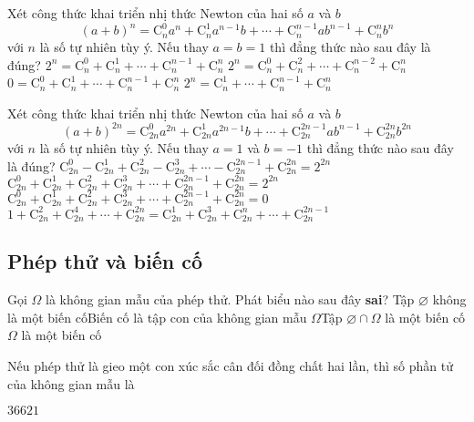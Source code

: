 \begin{ex}%
	Xét công thức khai triển nhị thức Newton của hai số $a$ và $b$
	$$\left(a+b\right)^n=\mathrm{C}^0_na^n+\mathrm{C}^1_na^{n-1}b+\cdots+\mathrm{C}^{n-1}_nab^{n-1}+\mathrm{C}^n_nb^n$$
	với $n$ là số tự nhiên tùy ý. Nếu thay $a=b=1$ thì đẳng thức nào sau đây là đúng?
	\choice
	{\True $2^n=\mathrm{C}^0_n+\mathrm{C}^1_n+\cdots+\mathrm{C}^{n-1}_n+\mathrm{C}^n_n$}
	{$2^n=\mathrm{C}^0_n+\mathrm{C}^2_n+\cdots+\mathrm{C}^{n-2}_n+\mathrm{C}^n_n$}
	{$0=\mathrm{C}^0_n+\mathrm{C}^1_n+\cdots+\mathrm{C}^{n-1}_n+\mathrm{C}^n_n$}
	{$2^n=\mathrm{C}^1_n+\cdots+\mathrm{C}^{n-1}_n+\mathrm{C}^n_n$}
	\loigiai{
	}
\end{ex}
\begin{ex}%
	Xét công thức khai triển nhị thức Newton của hai số $a$ và $b$
	$$\left(a+b\right)^{2n}=\mathrm{C}^0_{2n}a^{2n}+\mathrm{C}^1_{2n}a^{2n-1}b+\cdots+\mathrm{C}^{2n-1}_{2n}ab^{n-1}+\mathrm{C}^{2n}_{2n}b^{2n}$$
	với $n$ là số tự nhiên tùy ý. Nếu thay $a=1$ và $b=-1$ thì đẳng thức nào sau đây là đúng?
	\choice
	{$\mathrm{C}^0_{2n}-\mathrm{C}^1_{2n}+\mathrm{C}^2_{2n}-\mathrm{C}^3_{2n}+\cdots-\mathrm{C}^{2n-1}_{2n}+\mathrm{C}^{2n}_{2n}=2^{2n}$}
	{$\mathrm{C}^0_{2n}+\mathrm{C}^1_{2n}+\mathrm{C}^2_{2n}+\mathrm{C}^3_{2n}+\cdots+\mathrm{C}^{2n-1}_{2n}+\mathrm{C}^{2n}_{2n}=2^{2n}$}
	{$\mathrm{C}^0_{2n}+\mathrm{C}^1_{2n}+\mathrm{C}^2_{2n}+\mathrm{C}^3_{2n}+\cdots+\mathrm{C}^{2n-1}_{2n}+\mathrm{C}^{2n}_{2n}=0$}
	{\True $1+\mathrm{C}^2_{2n}+\mathrm{C}^4_{2n}+\cdots+\mathrm{C}^{2n}_{2n}=\mathrm{C}^1_{2n}+\mathrm{C}^3_{2n}+\mathrm{C}^{n}_{2n}+\cdots+\mathrm{C}^{2n-1}_{2n}$}
\end{ex}


\subsection{Phép thử và biến cố}
\begin{ex}%
	Gọi $\Omega$ là không gian mẫu của phép thử. Phát biểu nào sau đây {\bf sai}?
	\choice
	{\True Tập $\varnothing$ không là một biến cố}{Biến cố là tập con của không gian mẫu $\Omega$}{Tập $\varnothing\cap \Omega$ là một biến cố}{$\Omega$ là một biến cố}
\end{ex}
\begin{ex}%
	Nếu phép thử là gieo một con xúc sắc cân đối đồng chất hai lần, thì số phần tử của không gian mẫu là
	
	\choice
	{\True $36$}{$6$}{$2$}{$1$}
\end{ex}

